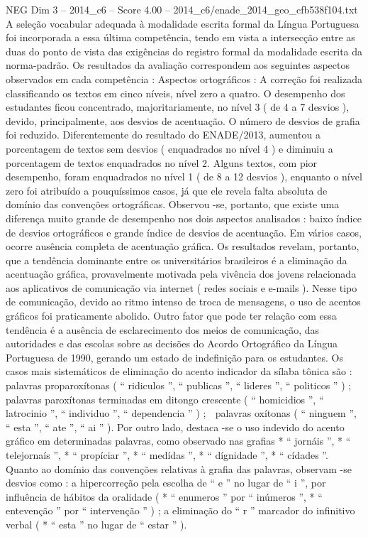 \begin{textsample}{NEG Dim 3 – 2014\_c6 – Score 4.00 – 2014\_c6/enade\_2014\_geo\_cfb538f104.txt}
A seleção vocabular adequada à modalidade escrita formal da Língua Portuguesa foi incorporada a essa última competência, tendo em vista a intersecção entre as duas do ponto de vista das exigências do registro formal da modalidade escrita da norma-padrão.
Os resultados da avaliação correspondem aos seguintes aspectos observados em cada competência : Aspectos ortográficos : A correção foi realizada classificando os textos em cinco níveis, nível zero a quatro.
O desempenho dos estudantes ficou concentrado, majoritariamente, no nível 3 ( de 4 a 7 desvios ), devido, principalmente, aos desvios de acentuação.
O número de desvios de grafia foi reduzido.
Diferentemente do resultado do ENADE/2013, aumentou a porcentagem de textos sem desvios ( enquadrados no nível 4 ) e diminuiu a porcentagem de textos enquadrados no nível 2.
Alguns textos, com pior desempenho, foram enquadrados no nível 1 ( de 8 a 12 desvios ), enquanto o nível zero foi atribuído a pouquíssimos casos, já que ele revela falta absoluta de domínio das convenções ortográficas.
Observou -se, portanto, que existe uma diferença muito grande de desempenho nos dois aspectos analisados : baixo índice de desvios ortográficos e grande índice de desvios de acentuação.
Em vários casos, ocorre ausência completa de acentuação gráfica.
Os resultados revelam, portanto, que a tendência dominante entre os universitários brasileiros é a eliminação da acentuação gráfica, provavelmente motivada pela vivência dos jovens relacionada aos aplicativos de comunicação via internet ( redes sociais e e-mails ).
Nesse tipo de comunicação, devido ao ritmo intenso de troca de mensagens, o uso de acentos gráficos foi praticamente abolido.
Outro fator que pode ter relação com essa tendência é a ausência de esclarecimento dos meios de comunicação, das autoridades e das escolas sobre as decisões do Acordo Ortográfico da Língua Portuguesa de 1990, gerando um estado de indefinição para os estudantes.
Os casos mais sistemáticos de eliminação do acento indicador da sílaba tônica são :  palavras proparoxítonas ( “ ridiculos ”, “ publicas ”, “ lideres ”, “ politicos ” ) ;  palavras paroxítonas terminadas em ditongo crescente ( “ homicidios ”, “ latrocinio ”, “ individuo ”, “ dependencia ” ) ;  palavras oxítonas ( “ ninguem ”, “ esta ”, “ ate ”, “ ai ” ).
Por outro lado, destaca -se o uso indevido do acento gráfico em determinadas palavras, como observado nas grafias * “ jornáis ”, * “ telejornaís ”, * “ propíciar ”, * “ medídas ”, * “ dígnidade ”, * “ cídades ”.
Quanto ao domínio das convenções relativas à grafia das palavras, observam -se desvios como : a hipercorreção pela escolha de “ e ” no lugar de “ i ”, por influência de hábitos da oralidade ( * “ enumeros ” por “ inúmeros ”, * “ entevenção ” por “ intervenção ” ) ; a eliminação do “ r ” marcador do infinitivo verbal ( * “ esta ” no lugar de “ estar ” ).

\end{textsample}
